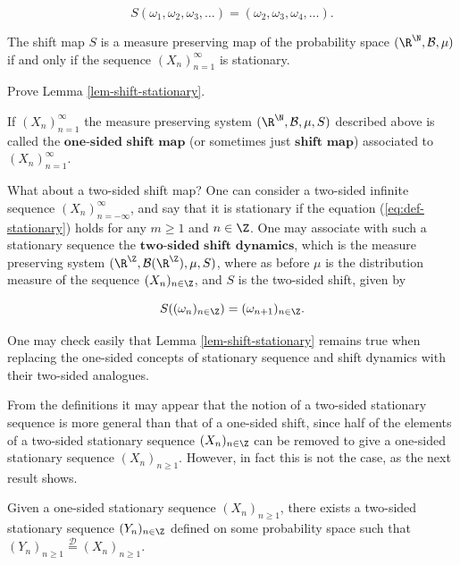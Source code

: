 \[
S(\omega_1,\omega_2, \omega_3, \ldots) = (\omega_2,\omega_3,\omega_4, \ldots).
\]

\begin{lem}
\label{lem-shift-stationary}
The shift map $S$ is a measure preserving map of the
probability space $(\R^\N,\mathcal{B},\mu)$ if and
only if the sequence $(X_n)_{n=1}^\infty$ is
stationary.
\end{lem}

\begin{xexercise}
Prove Lemma \ref{lem-shift-stationary}.
\end{xexercise}

\begin{defn}
If $(X_n)_{n=1}^\infty$ the measure preserving system
$(\R^\N,\mathcal{B},\mu,S)$ described above is called
the $\textbf{one-sided shift map}$ (or sometimes just
$\textbf{shift map}$) associated to
$(X_n)_{n=1}^\infty$.
\end{defn}

\noindent What about a two-sided shift map? One can consider a
two-sided infinite sequence
$(X_n)_{n=-\infty}^\infty$, and say that it is
stationary if the equation (\ref{eq:def-stationary}) holds
for any $m\ge1$ and $n\in\Z$. One may associate with
such a stationary sequence the
$\textbf{two-sided shift dynamics}$, which is the
measure preserving system
$(\R^\Z,\mathcal{B}(\R^\Z), \mu, S)$, where as before
$\mu$ is the distribution measure of the sequence
$(X_n)_{n\in\Z}$, and $S$ is the two-sided shift,
given by

\[
S((\omega_n)_{n\in\Z}) = (\omega_{n+1})_{n\in\Z}.
\]

\noindent One may check easily that Lemma
\ref{lem-shift-stationary} remains true when replacing the
one-sided concepts of stationary sequence and shift
dynamics with their two-sided analogues.

From the definitions it may appear that the notion of
a two-sided stationary sequence is more general than
that of a one-sided shift, since half of the elements
of a two-sided stationary sequence $(X_n)_{n\in\Z}$
can be removed to give a one-sided stationary sequence
$(X_n)_{n\ge 1}$. However, in fact this is not the
case, as the next result shows.

\begin{lem}
Given a one-sided stationary sequence
$(X_n)_{n\ge 1}$, there exists a two-sided stationary
sequence $(Y_n)_{n\in\Z}$ defined on some probability
space such that
$(Y_n)_{n\ge1} \stackrel{\mathcal{D}}{=}
(X_n)_{n\ge1}$.
\end{lem}

